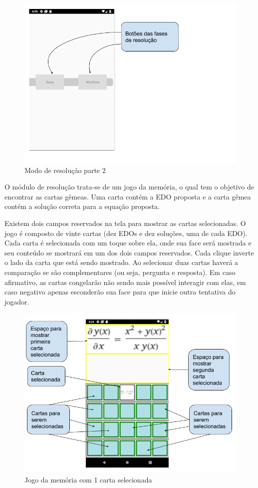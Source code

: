 \begin{figure}[H]
\centering
\caption{Modo de resolução parte 2}
\includegraphics[scale=0.52]{figuras/modo_resolucao_2.png}
\end{figure}


O módulo de resolução trata-se de um jogo da memória, o qual tem o objetivo de encontrar as cartas gêmeas. Uma carta contém a EDO proposta e a carta gêmea contém a solução correta para a equação proposta.

Existem dois campos reservados na tela para mostrar as cartas selecionadas. O jogo é composto de vinte cartas (dez EDOs e dez soluções, uma de cada EDO). Cada carta é selecionada com um toque sobre ela, onde sua face será mostrada e seu conteúdo se mostrará em um dos dois campos reservados. Cada clique inverte o lado da carta que está sendo mostrado. Ao selecionar duas cartas haverá a comparação se são complementares (ou seja, pergunta e resposta). Em caso afirmativo, as cartas congelarão não sendo mais possível interagir com elas, em caso negativo apenas esconderão sua face para que inicie outra tentativa do jogador.

\begin{figure}[H]
\centering
\caption{Jogo da memória com 1 carta selecionada}
\includegraphics[width=\textwidth,height=\textheight,keepaspectratio]{figuras/resolucao_1imagem.png}
\end{figure}

